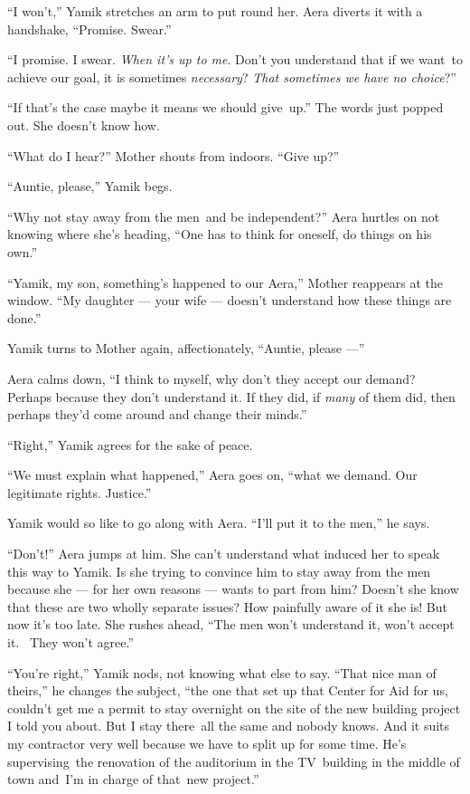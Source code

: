\documentclass[twoside,11pt,openany]{book}
\begin{document}
``I won't,'' Yamik stretches an arm to put round her. Aera diverts it with a handshake,
``Promise. Swear.''

``I promise. I swear. \textit{When it's up to me}. Don't you understand that if we want~to achieve our
goal, it is sometimes \textit{necessary}? \textit{That sometimes we have no choice}?''

``If that's the case maybe it means we should give~up.'' The words just popped out. She
doesn't know how.

{}``What do I hear?'' Mother shouts from indoors. ``Give up?''

{}``Auntie, please,'' Yamik begs.

{}``Why not stay away from the men~and be independent?'' Aera hurtles on not knowing where she's heading,
``One has to think for oneself, do things on his own.''

``Yamik, my son, something's happened to our Aera,'' Mother reappears at the window.
``My daughter --- your wife ---  doesn't understand how these things are done.''

Yamik turns to Mother again, affectionately, ``Auntie, please ---''

Aera calms down, ``I think to myself, why don't they accept our demand? Perhaps because they don't
understand it. If they did, if \textit{many} of them did, then perhaps they'd come around and change their
minds.''

``Right,'' Yamik agrees for the sake of peace.

``We must explain what happened,'' Aera goes on, ``what we demand. Our legitimate rights.
Justice.''

Yamik would so like to go along with Aera. ``I'll put it to the men,'' he says.

``Don't!'' Aera jumps at him. She can't understand what induced her to speak this way to
Yamik. Is she trying to convince him to stay away from the men because she --- for her own reasons --- wants to part from
him? Doesn't she know that these are two wholly separate issues? How painfully aware of it she is! But now it's too
late. She rushes ahead, ``The men won't understand it, won't accept it.~ They won't agree.''

``You're right,'' Yamik nods, not knowing what else to say. ``That nice man of
theirs,'' he changes the subject, ``the one that set up that Center for Aid for us, couldn't get me a permit to stay
overnight on the site of the new building project I told you about. But I stay there~all the same and nobody knows. And
it suits my contractor very well because we have to split up for some time. He's supervising~the renovation of the
auditorium in the TV~building in the middle of town and~I'm in charge of that~new project.''
\end{document}
